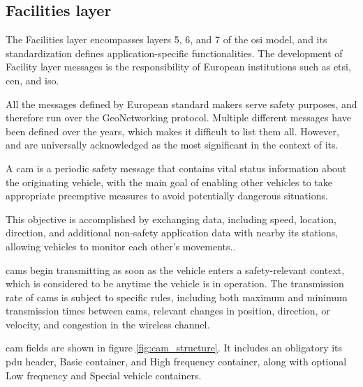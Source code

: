 \subsection[Facilities layer]{Facilities layer}
\label{subsec:Facilities}

The Facilities layer encompasses layers 5, 6, and 7 of the \gls{osi} model, and its standardization defines application-specific functionalities\cite{festag_standards_2015}. The development of Facility layer messages is the responsibility of European institutions such as \gls{etsi}, \gls{cen}, and \gls{iso}.

All the messages defined by European standard makers serve safety purposes, and therefore run over the GeoNetworking protocol\cite{festag_standards_2015}. Multiple different messages have been defined over the years\cite{festag_cooperative_2014}, which makes it difficult to list them all. However,  and  are universally acknowledged as the most significant in the context of \gls{its}.

A \gls{cam}\cite{etsi_intelligent_2019-2} is a periodic safety message that contains vital status information about the originating vehicle, with the main goal of enabling other vehicles to take appropriate preemptive measures to avoid potentially dangerous situations\cite{al-sultan_comprehensive_2014}.

This objective is accomplished by exchanging data, including speed, location, direction, and additional non-safety application data with nearby \gls{its} stations, allowing vehicles to monitor each other's movements.\cite{festag_standards_2015}.

\glspl{cam} begin transmitting as soon as the vehicle enters a safety-relevant context, which is considered to be anytime the vehicle is in operation.\cite{festag_cooperative_2014} The transmission rate of \glspl{cam} is subject to specific rules, including both maximum and minimum transmission times between \glspl{cam}, relevant changes in position, direction, or velocity, and congestion in the wireless channel\cite{festag_cooperative_2014}.

\gls{cam} fields are shown in figure \ref{fig:cam_structure}. It includes an obligatory \gls{its} \gls{pdu} header, Basic container, and High frequency container, along with optional Low frequency and Special vehicle containers.

